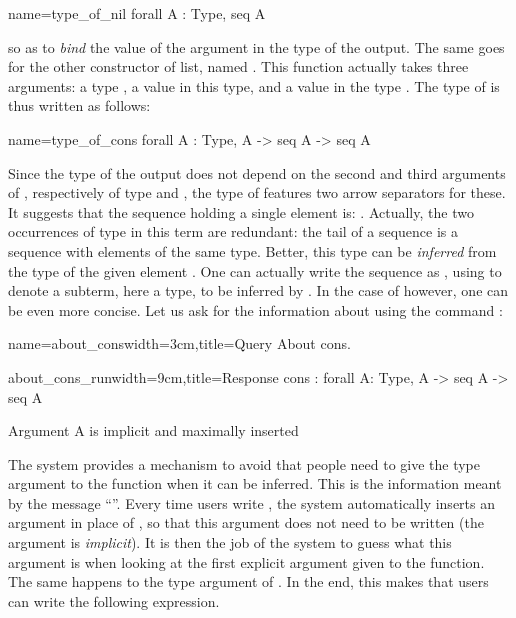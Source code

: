\begin{coq}{name=type_of_nil}{}
  forall A : Type, seq A
\end{coq}
so as to \emph{bind} the value  of the argument in the type of
the output. The same goes for the other constructor of list, named
.  This function actually takes three arguments: a type ,
a value in this type, and a value in the type .  The type
of  is thus written as follows:

\begin{coq}{name=type_of_cons}{}
  forall A : Type, A -> seq A -> seq A
\end{coq}
 Since the type of
the output does not depend on the second and third arguments of
, respectively of type  and , the type of
 features two arrow separators for these.
It suggests that the sequence holding a single element  is:
. Actually, the two
occurrences of type  in this term are redundant: the tail of a
sequence is a sequence with elements of the same type. Better, this type can be
\emph{inferred} from the type of the given element . One can
actually write the sequence as  , using \C{_} to
denote  a subterm, here a type, to be inferred by \Coq{}. In the case of
 however, one can be even more concise. Let us ask for the
information about  using the command :

\begin{coq}{name=about_cons}{width=3cm,title=Query}
About cons.
$~$
$~$
\end{coq}
\begin{coqout}{about_cons_run}{width=9cm,title=Response}
cons : forall A: Type, A -> seq A -> seq A

Argument A is implicit and maximally inserted
\end{coqout}

The \Coq{} system provides a mechanism to avoid that
people need to give the type argument to the  function when it
can be inferred.  This is
the information meant by the message ``''.  Every time users write , the system automatically
inserts an argument in place of , so that this argument does not
need to be written (the argument is {\em implicit}).  It is then the
job of the \Coq{} system to guess what this argument is when looking at
the first explicit argument given to the function.  The same happens
to the type argument of .  In the end, this makes that users can
write the following expression.

